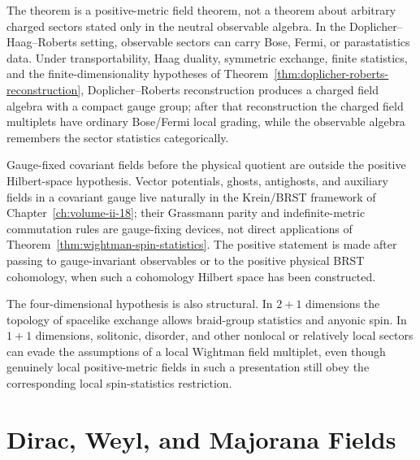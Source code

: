 \begin{remark}
The theorem is a positive-metric field theorem, not a theorem about arbitrary
charged sectors stated only in the neutral observable algebra.  In the
Doplicher--Haag--Roberts setting, observable sectors can carry Bose, Fermi, or
parastatistics data.  Under transportability, Haag duality, symmetric
exchange, finite statistics, and the finite-dimensionality hypotheses of
Theorem~\ref{thm:doplicher-roberts-reconstruction}, Doplicher--Roberts
reconstruction produces a charged field algebra with a compact gauge group;
after that reconstruction the charged field multiplets have ordinary
Bose/Fermi local grading, while the observable algebra remembers the sector
statistics categorically.

Gauge-fixed covariant fields before the physical quotient are outside the
positive Hilbert-space hypothesis.  Vector potentials, ghosts, antighosts, and
auxiliary fields in a covariant gauge live naturally in the Krein/BRST
framework of Chapter~\ref{ch:volume-ii-18}; their Grassmann parity and
indefinite-metric commutation rules are gauge-fixing devices, not direct
applications of Theorem~\ref{thm:wightman-spin-statistics}.  The positive
statement is made after passing to gauge-invariant observables or to the
positive physical BRST cohomology, when such a cohomology Hilbert space has
been constructed.

The four-dimensional hypothesis is also structural.  In \(2+1\) dimensions
the topology of spacelike exchange allows braid-group statistics and anyonic
spin.  In \(1+1\) dimensions, solitonic, disorder, and other nonlocal or
relatively local sectors can evade the assumptions of a local Wightman field
multiplet, even though genuinely local positive-metric fields in such a
presentation still obey the corresponding local spin-statistics restriction.
\end{remark}

\section{Dirac, Weyl, and Majorana Fields}

